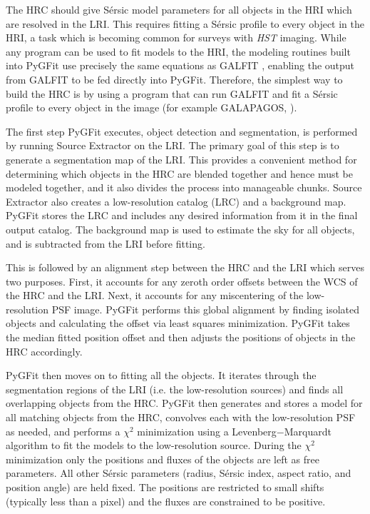 \documentclass[apj]{emulateapj}
\newcommand{\sersic}{S\'{e}rsic}
\newcommand{\galfit}{GALFIT}
\newcommand{\pygfit}{PyGFit}
\newcommand{\extractor}{Source Extractor}
\newcommand{\galapagos}{GALAPAGOS}
\begin{document}
The HRC should give \sersic{} model parameters for all objects in the HRI which are resolved in the LRI.  This requires fitting a \sersic{} profile to every object in the HRI, a task which is becoming common for surveys with {\itshape HST} imaging.  While any program can be used to fit models to the HRI, the modeling routines built into \pygfit{} use precisely the same equations as \galfit{} \citep{peng02,peng10}, enabling the output from \galfit{} to be fed directly into \pygfit{}.  Therefore, the simplest way to build the HRC is by using a program that can run \galfit{} and fit a \sersic{} profile to every object in the image (for example \galapagos{}, \citealt{galapagos}).

The first step \pygfit{} executes, object detection and segmentation, is performed by running \extractor{} \citep{bertin96} on the LRI.  The primary goal of this step is to generate a segmentation map of the LRI.  This provides a convenient method for determining which objects in the HRC are blended together and hence must be modeled together, and it also divides the process into manageable chunks.  \extractor{} also creates a low-resolution catalog (LRC) and a background map.  \pygfit{} stores the LRC and includes any desired information from it in the final output catalog.  The background map is used to estimate the sky for all objects, and is subtracted from the LRI before fitting.

This is followed by an alignment step between the HRC and the LRI which serves two purposes.  First, it accounts for any zeroth order offsets between the WCS of the HRC and the LRI.  Next, it accounts for any miscentering of the low-resolution PSF image.  \pygfit{} performs this global alignment by finding isolated objects and calculating the offset via least squares minimization.  \pygfit{} takes the median fitted position offset and then adjusts the positions of objects in the HRC accordingly.

\pygfit{} then moves on to fitting all the objects.  It iterates through the segmentation regions of the LRI (i.e. the low-resolution sources) and finds all overlapping objects from the HRC.  \pygfit{} then generates and stores a model for all matching objects from the HRC, convolves each with the low-resolution PSF as needed, and performs a $\chi^2$ minimization using a Levenberg$-$Marquardt algorithm to fit the models to the low-resolution source.  During the $\chi^2$ minimization only the positions and fluxes of the objects are left as free parameters.  All other \sersic{} parameters (radius, \sersic{} index, aspect ratio, and position angle) are held fixed.  The positions are restricted to small shifts (typically less than a pixel) and the fluxes are constrained to be positive.
\end{document}
